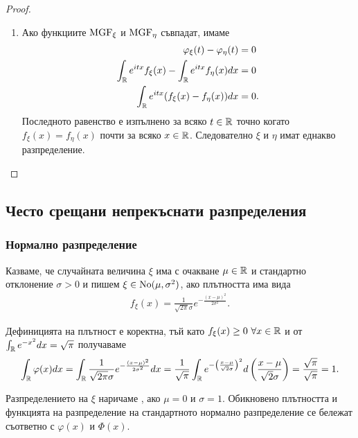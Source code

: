 \documentclass[numbers=endperiod, bibliography=totocnumbered]{scrartcl}
\begin{document}
\begin{proof}
\begin{enumerate}
    \item Ако функциите \( \operatorname{MGF}_\xi \) и \( \operatorname{MGF}_\eta \) съвпадат, имаме
    \begin{align*}
      \varphi_\xi(t) - \varphi_\eta(t) &= 0
      \\
      \int_{\mathbb{R}} e^{itx} f_\xi(x) - \int_{\mathbb{R}} e^{itx} f_\eta(x) dx &= 0
      \\
      \int_{\mathbb{R}} e^{itx} (f_\xi(x) - f_\eta(x)) dx &= 0.
    \end{align*}
    Последното равенство е изпълнено за всяко \( t \in \mathbb{R} \) точно когато \( f_\xi(x) = f_\eta(x) \) почти за всяко \( x \in \mathbb{R} \). Следователно \( \xi \) и \( \eta \) имат еднакво разпределение.
  \end{enumerate}
\end{proof}

\subsection{Често срещани непрекъснати разпределения}

\subsubsection{Нормално разпределение}\label{dist:normal}

\begin{definition}
  Казваме, че случайната величина \( \xi \) има  с очакване \( \mu \in \mathbb{R} \) и стандартно отклонение \( \sigma > 0 \) и пишем \( \xi \in \operatorname{No}(\mu, \sigma^2) \), ако плътността има вида
  \begin{align*}
    f_\xi(x) = \frac 1 {\sqrt{2\pi} \sigma} e^{-\frac{{(x-\mu)}^2} {2\sigma^2}}.
  \end{align*}

  Дефиницията на плътност е коректна, тъй като \( f_\xi(x) \geq 0~\forall x \in \mathbb{R} \) и от \( \int_{\mathbb{R}} e^{-x^2} dx = \sqrt \pi \) получаваме
  \begin{align*}
    \int_{\mathbb{R}} \varphi(x) dx
    =
    \int_{\mathbb{R}} \frac 1 {\sqrt{2\pi} \sigma} e^{-\frac{{(x-\mu)}^2} {2\sigma^2}} dx
    =
    \frac 1 {\sqrt{\pi}} \int_{\mathbb{R}} e^{-{\left(\frac {x-\mu} {\sqrt 2 \sigma} \right)}^2} d\left(\frac {x-\mu} {\sqrt 2 \sigma} \right)
    =
    \frac {\sqrt{\pi}} {\sqrt{\pi}}
    =
    1.
  \end{align*}

  Разпределението на \( \xi \) наричаме , ако \( \mu = 0 \) и \( \sigma = 1 \). Обикновено плътността и функцията на разпределение на стандартното нормално разпределение се бележат съответно с \( \varphi(x) \) и \( \Phi(x) \).
\end{definition}
\end{document}
